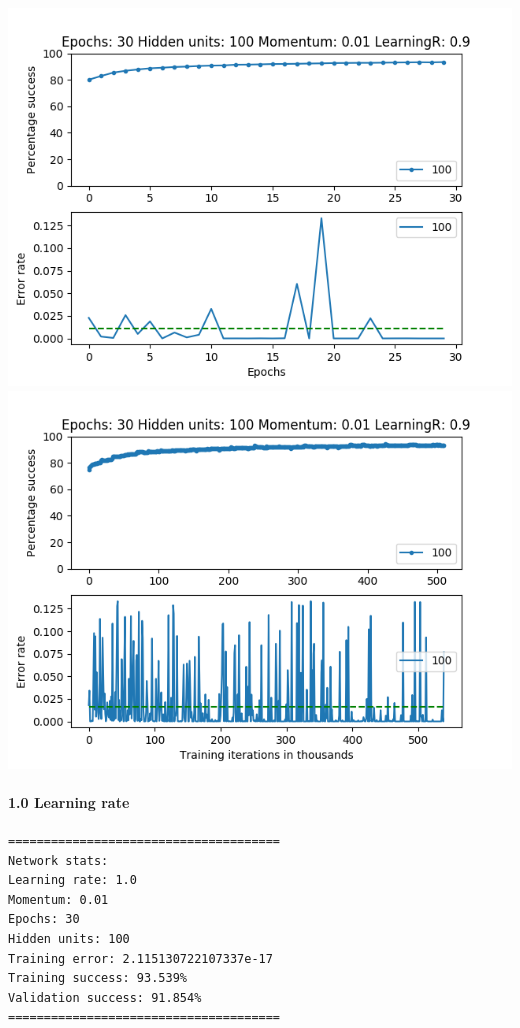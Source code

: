 \documentclass[11pt]{article}
\makeatletter
\def\maxwidth{\ifdim\Gin@nat@width>\linewidth\linewidth
    \else\Gin@nat@width\fi}
\let\Oldincludegraphics\includegraphics
\renewcommand{\includegraphics}[1]{\Oldincludegraphics[width=.8\maxwidth]{#1}}
\makeatother
\begin{document}
\includegraphics{Experiment2/E2_NN_Epoch_Momentum_0.01_30Epochs_100_LR_0.9_Hiddenunits.png}
\includegraphics{Experiment2/E2_NN_Training_Momentum_0.01_30Epochs_100_LR_0.9_Hiddenunits.png}

\hypertarget{learning-rate-10}{%
\paragraph{1.0 Learning rate}\label{learning-rate-10}}

\begin{verbatim}
======================================
Network stats: 
Learning rate: 1.0
Momentum: 0.01
Epochs: 30
Hidden units: 100
Training error: 2.115130722107337e-17
Training success: 93.539%
Validation success: 91.854%
======================================
\end{verbatim}
\end{document}
